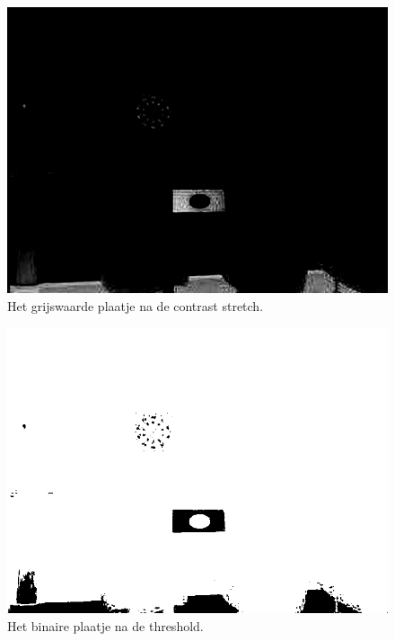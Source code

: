 \begin{figure}
    \begin{center}
        \includegraphics[scale=0.35]{figures/vision/stretched.png}
    \end{center}
    \caption{Het grijswaarde plaatje na de contrast stretch.}
    \label{fig:contastStretch}
\end{figure}

\begin{figure}
    \begin{center}
        \includegraphics[scale=0.35]{figures/vision/thresholded.png}
    \end{center}
    \caption{Het binaire plaatje na de threshold.}
    \label{fig:threshold}
\end{figure}

